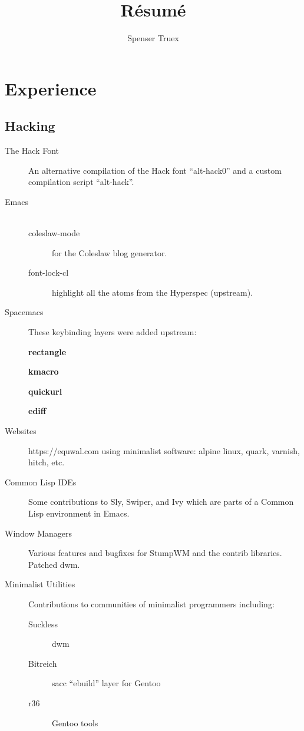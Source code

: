


\title{R\'esum\'e}
\author{Spenser Truex}

\maketitle

\section{Experience}
\subsection{Hacking}
\begin{description}
    \item [The Hack Font]{An alternative compilation of the Hack font ``alt-hack0'' and a custom compilation script ``alt-hack''.}

    \item [Emacs] {
        \begin{description}
            \item[\\] {} %
            \item [coleslaw-mode] {for the Coleslaw blog generator.}
            \item [font-lock-cl] {highlight all the atoms from the Hyperspec (upstream).}
        \end{description}
}
\item [Spacemacs]{{These keybinding layers were added upstream:}

        {\bfseries rectangle}

        {\bfseries kmacro}

        {\bfseries quickurl}

        {\bfseries ediff}
}


\item [Websites] {https://equwal.com using minimalist software: alpine linux, quark, varnish, hitch, etc.}
\item [Common Lisp IDEs] {Some contributions to Sly, Swiper, and Ivy which are parts of a Common Lisp environment in Emacs.}
\item [Window Managers] {Various features and bugfixes for StumpWM and the contrib libraries. Patched dwm.}
\item [Minimalist Utilities] {Contributions to communities of minimalist programmers including:}
    \begin{description}
        \item[Suckless]{dwm}
        \item[Bitreich]{sacc ``ebuild'' layer for Gentoo}
        \item[r36]{Gentoo tools}
    \end{description}
\end{description}

